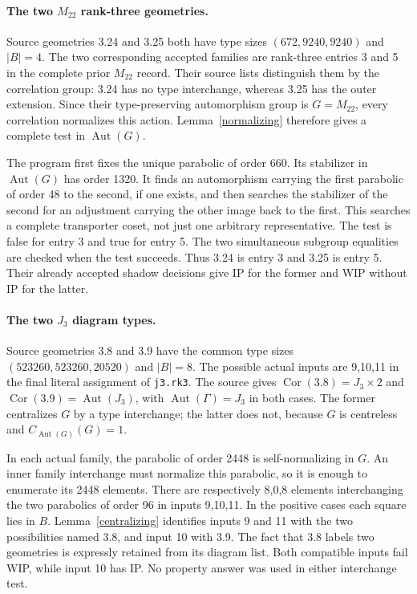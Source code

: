 \documentclass[11pt,a4paper]{article}
\newcommand{\Aut}{\operatorname{Aut}}
\newcommand{\Cor}{\operatorname{Cor}}
\begin{document}
\paragraph{The two $M_{22}$ rank-three geometries.}
Source geometries 3.24 and 3.25 both have type sizes
$(672,9240,9240)$ and $|B|=4$. The two corresponding accepted families
are rank-three entries 3 and 5 in the complete prior $M_{22}$ record.
Their source lists distinguish them by the correlation group: 3.24
has no type interchange, whereas 3.25 has the outer extension.
Since their type-preserving automorphism group is $G=M_{22}$,
every correlation normalizes this action. Lemma~\ref{normalizing}
therefore gives a complete test in $\Aut(G)$.

The program first fixes the unique parabolic of order 660. Its
stabilizer in $\Aut(G)$ has order 1320. It finds an automorphism
carrying the first parabolic of order 48 to the second, if one exists,
and then searches the stabilizer of the second for an adjustment
carrying the other image back to the first. This searches a complete
transporter coset, not just one arbitrary representative. The test is
false for entry 3 and true for entry 5. The two simultaneous subgroup
equalities are checked when the test succeeds. Thus 3.24 is entry 3
and 3.25 is entry 5. Their already accepted shadow decisions give
IP for the former and WIP without IP for the latter.

\paragraph{The two $J_3$ diagram types.}
Source geometries 3.8 and 3.9 have the common type sizes
$(523260,523260,20520)$ and $|B|=8$. The possible actual inputs are
9,10,11 in the final literal assignment of \texttt{j3.rk3}.
The source gives $\Cor(3.8)=J_3\times2$ and
$\Cor(3.9)=\Aut(J_3)$, with $\Aut(\Gamma)=J_3$ in both cases.
The former centralizes $G$ by a type interchange; the latter does not,
because $G$ is centreless and $C_{\Aut(G)}(G)=1$.

In each actual family, the parabolic of order 2448 is self-normalizing
in $G$. An inner family interchange must normalize this parabolic,
so it is enough to enumerate its 2448 elements. There are respectively
8,0,8 elements interchanging the two parabolics of order 96 in inputs
9,10,11. In the positive cases each square lies in $B$.
Lemma~\ref{centralizing} identifies inputs 9 and 11 with the two
possibilities named 3.8, and input 10 with 3.9. The fact that 3.8
labels two geometries is expressly retained from its diagram list.
Both compatible inputs fail WIP, while input 10 has IP. No property
answer was used in either interchange test.
\end{document}
